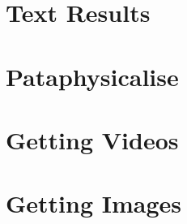 

\section{Text Results}



\section{Pataphysicalise}



\section{Getting Videos}



\section{Getting Images}


